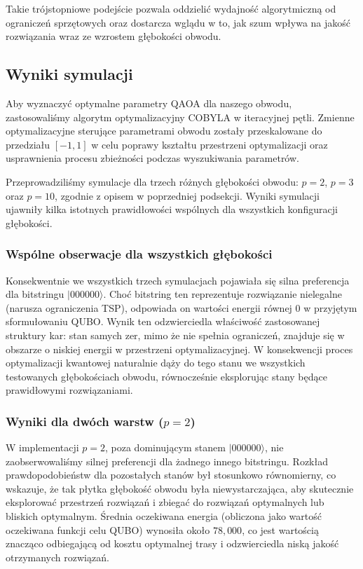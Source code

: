 Takie trójstopniowe podejście pozwala oddzielić wydajność algorytmiczną od ograniczeń sprzętowych oraz dostarcza wglądu w to, jak szum wpływa na jakość rozwiązania wraz ze wzrostem głębokości obwodu.

\subsection{Wyniki symulacji}

Aby wyznaczyć optymalne parametry QAOA dla naszego obwodu, zastosowaliśmy algorytm optymalizacyjny COBYLA w iteracyjnej pętli. Zmienne optymalizacyjne sterujące parametrami obwodu zostały przeskalowane do przedziału $[-1, 1]$ w celu poprawy kształtu przestrzeni optymalizacji oraz usprawnienia procesu zbieżności podczas wyszukiwania parametrów.

Przeprowadziliśmy symulacje dla trzech różnych głębokości obwodu: $p=2$, $p=3$ oraz $p=10$, zgodnie z opisem w poprzedniej podsekcji. Wyniki symulacji ujawniły kilka istotnych prawidłowości wspólnych dla wszystkich konfiguracji głębokości.


\subsubsection*{Wspólne obserwacje dla wszystkich głębokości}

Konsekwentnie we wszystkich trzech symulacjach pojawiała się silna preferencja dla bitstringu $|000000\rangle$. Choć bitstring ten reprezentuje rozwiązanie nielegalne (narusza ograniczenia TSP), odpowiada on wartości energii równej 0 w przyjętym sformułowaniu QUBO. Wynik ten odzwierciedla właściwość zastosowanej struktury kar: stan samych zer, mimo że nie spełnia ograniczeń, znajduje się w obszarze o niskiej energii w przestrzeni optymalizacyjnej. W konsekwencji proces optymalizacji kwantowej naturalnie dąży do tego stanu we wszystkich testowanych głębokościach obwodu, równocześnie eksplorując stany będące prawidłowymi rozwiązaniami.


\subsubsection*{Wyniki dla dwóch warstw ($p=2$)}

W implementacji $p=2$, poza dominującym stanem $|000000\rangle$, nie zaobserwowaliśmy silnej preferencji dla żadnego innego bitstringu. Rozkład prawdopodobieństw dla pozostałych stanów był stosunkowo równomierny, co wskazuje, że tak płytka głębokość obwodu była niewystarczająca, aby skutecznie eksplorować przestrzeń rozwiązań i zbiegać do rozwiązań optymalnych lub bliskich optymalnym. Średnia oczekiwana energia (obliczona jako wartość oczekiwana funkcji celu QUBO) wynosiła około $78{,}000$, co jest wartością znacząco odbiegającą od kosztu optymalnej trasy i odzwierciedla niską jakość otrzymanych rozwiązań.

